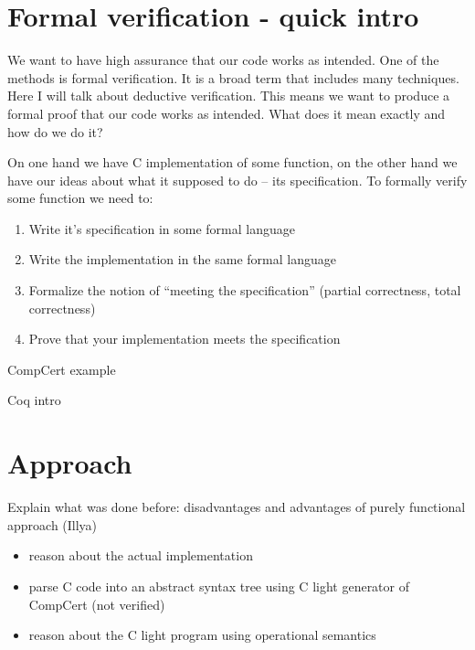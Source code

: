 \documentclass{beamer}
\begin{document}
\section{Formal verification - quick intro}
\begin{frame}
 
   We want to have high assurance that our code works as intended. One of the methods is formal verification. It is a broad term that includes many techniques. Here I will talk about deductive verification. This means we want to produce a formal proof that our code works as intended. What does it mean exactly and how do we do it?
  
   On one hand we have C implementation of some function,
   on the other hand we have our ideas about what it supposed to do -- its specification. To formally verify some function we need to:
  \begin{enumerate}
  \item Write it's specification in some formal language  
  \item Write the implementation in the same formal language
  \item Formalize the notion of ``meeting the specification'' (partial correctness, total correctness)
  \item Prove that your implementation meets the specification
  \end{enumerate}
\end{frame}



\begin{frame}
CompCert example
\end{frame}
\begin{frame}{Coq intro}
\end{frame}

\section{Approach}

\begin{frame}
Explain what was done before: disadvantages and advantages of purely functional approach (Illya)
\end{frame}


 
\begin{frame}
\begin{itemize}
\item reason about the actual implementation
\item parse C code into an abstract syntax tree using C light generator of CompCert (not verified)
\item reason about the C light program using operational semantics
\end{itemize}
\end{frame}
\end{document}
